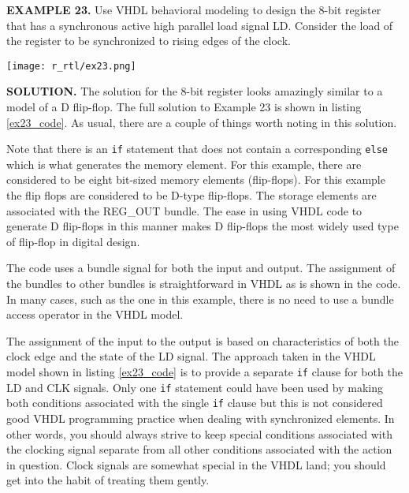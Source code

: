 \begin{leftbar}
\begin{minipage}[t]{0.52\textwidth}
\vspace{10pt}
\noindent
\textbf{EXAMPLE 23.}
Use VHDL behavioral modeling to design the 8-bit register that has a synchronous active high parallel load signal LD. Consider the load of the register to be synchronized to rising edges of the clock. 
\end{minipage}
\begin{minipage}[t]{0.47\textwidth}
\vspace{0pt}\raggedright
    \centering
	\texttt{[image: r\_rtl/ex23.png]}
\end{minipage}
\end{leftbar}
\noindent
\textbf{SOLUTION.} The solution for the 8-bit register looks amazingly similar to a model of a D flip-flop. The full solution to Example 23 is shown in listing \ref{ex23_code}. As usual, there are a couple of things worth noting in this solution.
\begin{my_list}
\item Note that there is an \texttt{if} statement that does not contain a corresponding \texttt{else} which is what generates the memory element. For this example, there are considered to be eight bit-sized memory elements (flip-flops). For this example the flip flops are considered to be D-type flip-flops. The storage elements are associated with the REG\_OUT bundle. The ease in using VHDL code to generate D flip-flops in this manner makes D flip-flops the most widely used type of flip-flop in digital design.

\item The code uses a bundle signal for both the input and output. The assignment of the bundles to other bundles is straightforward in VHDL as is shown in the code. In many cases, such as the one in this example, there is no need to use a bundle access operator in the VHDL model. 

\item The assignment of the input to the output is based on characteristics of both the clock edge and the state of the LD signal. The approach taken in the VHDL model shown in listing \ref{ex23_code} is to provide a separate \texttt{if} clause for both the LD and CLK signals. Only one \texttt{if} statement could have been used by making both conditions associated with the single \texttt{if} clause but this is not considered good VHDL programming practice when dealing with synchronized elements. In other words, you should always strive to keep special conditions associated with the clocking signal separate from all other conditions associated with the action in question. Clock signals are somewhat special in the VHDL land; you should get into the habit of treating them gently. 
\end{my_list}

